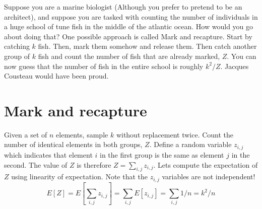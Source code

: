 \documentclass{article}
\begin{document}


Suppose you are a marine biologist (Although you prefer to pretend to be an architect), and
suppose you are tasked with counting the number of individuals in a huge school of tune fish in 
the middle of the atlantic ocean. How would you go about doing that? 
One possible approach is called Mark and recapture.
Start by catching $k$ fish. Then, mark them somehow 
and release them. Then catch another group of $k$ fish and count the number of fish that are already marked, $Z$.
You can now guess that the number of fish in the entire school is roughly $k^2/Z$.
Jacques Cousteau would have been proud.

\section*{Mark and recapture}
Given a set of $n$ elements, sample $k$ without replacement twice.
Count the number of identical elements in both groups, $Z$.
Define a random variable $z_{i,j}$ which indicates that
element $i$ in the first group is the same as element $j$ in the second.
The value of $Z$ is therefore $Z = \sum_{i,j} z_{i,j}$.
Lets compute the expectation of $Z$ using linearity of expectation.
Note that the $z_{i,j}$ variables are not independent!
\begin{equation}
E[Z] = E[\sum_{i,j} z_{i,j}] = \sum_{i,j} E [z_{i,j}] = \sum_{i,j} 1/n = k^2/n
\end{equation}


%
\end{document}
